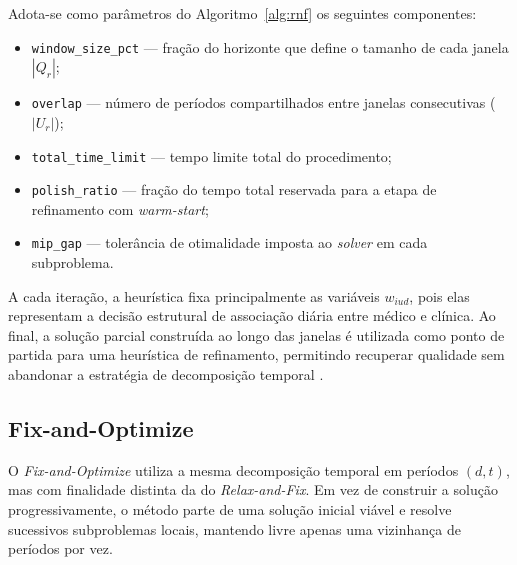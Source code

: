 Adota-se como parâmetros do Algoritmo~\ref{alg:rnf} os seguintes componentes:

\begin{itemize}
    \item \texttt{window\_size\_pct} — fração do horizonte que define o tamanho de cada janela $|Q_r|$;
    \item \texttt{overlap} — número de períodos compartilhados entre janelas consecutivas ($|U_r|$);
    \item \texttt{total\_time\_limit} — tempo limite total do procedimento;
    \item \texttt{polish\_ratio} — fração do tempo total reservada para a etapa de refinamento com \textit{warm-start};
    \item \texttt{mip\_gap} — tolerância de otimalidade imposta ao \textit{solver} em cada subproblema.
\end{itemize}
    
A cada iteração, a heurística fixa principalmente as variáveis $w_{iud}$, pois elas representam a decisão estrutural de associação diária entre médico e clínica. Ao final, a solução parcial construída ao longo das janelas é utilizada como ponto de partida para uma heurística de refinamento, permitindo recuperar qualidade sem abandonar a estratégia de decomposição temporal \cite{Turhan_Bilgen_2020}. 

\subsection{Fix-and-Optimize}

O \textit{Fix-and-Optimize} utiliza a mesma decomposição temporal em períodos $(d,t)$, mas com finalidade distinta da do \textit{Relax-and-Fix}. Em vez de construir a solução progressivamente, o método parte de uma solução inicial viável e resolve sucessivos subproblemas locais, mantendo livre apenas uma vizinhança de períodos por vez.

